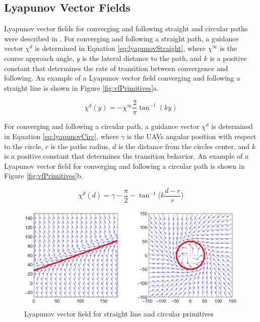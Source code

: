 \documentclass[numbered,pdftex]{ohio-etd}
\begin{document}
 
 
\subsection{Lyapunov Vector Fields}



Lyapunov vector fields for converging and following straight and circular paths were described in \cite{nelson_cooperative_2005}. For converging and following a straight path, a guidance vector $\chi^{d}$ is determined in Equation \ref{eq:lyapunovStraight}, where $\chi^{\infty}$ is the course approach angle, $y$ is the lateral distance to the path, and $k$ is a positive constant that determines the rate of transition between convergence and following. An example of a Lyapunov vector field converging and following a straight line is shown in Figure \ref{fig:vfPrimitives}a.




\begin{equation}\label{eq:lyapunovStraight}
\chi^d(y) = -\chi^{\infty}\frac{2}{\pi}\tan^{-1}(ky)
\end{equation}



For converging and following a circular path, a guidance vector $\chi^{d}$ is determined in Equation \ref{eq:lyapunovCirc}, where $\gamma$ is the UAVs angular position with respect to the circle, $r$ is the paths radius, $d$ is the distance from the circles center, and $k$ is a positive constant that determines the transition behavior. An example of a Lyapunov vector field for converging and following a circular path is shown in Figure \ref{fig:vfPrimitives}b.

\begin{equation}\label{eq:lyapunovCirc}
\chi^d(d) = \gamma-\frac{\pi}{2}-\tan^{-1} \bigg(k \frac{d-r}{r} \bigg)
\end{equation}


\begin{figure}
	\centering
	\includegraphics[width=13cm]{PaperFigures/nelsonLyapunov}
	\caption{Lyapunov vector field for straight line and circular primitives \cite{nelson_cooperative_2005}}
	\label{fig:vfPathPrimitives}
\end{figure}
\end{document}
